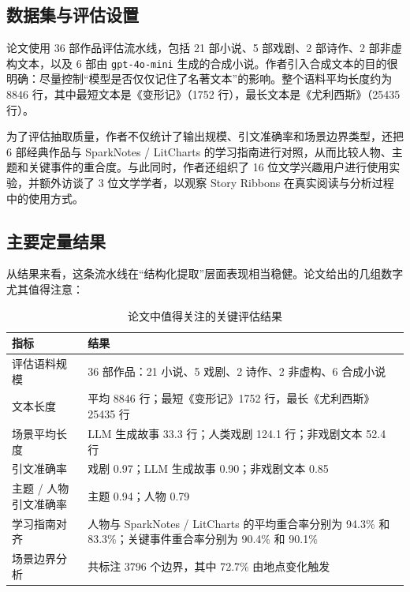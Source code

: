 \documentclass[a4paper,12pt,UTF8]{article}
\begin{document}
\subsection{数据集与评估设置}
论文使用 36 部作品评估流水线，包括 21 部小说、5 部戏剧、2 部诗作、2 部非虚构文本，以及 6 部由 \texttt{gpt-4o-mini} 生成的合成小说。作者引入合成文本的目的很明确：尽量控制“模型是否仅仅记住了名著文本”的影响。整个语料平均长度约为 8846 行，其中最短文本是《变形记》（1752 行），最长文本是《尤利西斯》（25435 行）。

为了评估抽取质量，作者不仅统计了输出规模、引文准确率和场景边界类型，还把 6 部经典作品与 SparkNotes / LitCharts 的学习指南进行对照，从而比较人物、主题和关键事件的重合度。与此同时，作者还组织了 16 位文学兴趣用户进行使用实验，并额外访谈了 3 位文学学者，以观察 Story Ribbons 在真实阅读与分析过程中的使用方式。

\subsection{主要定量结果}
从结果来看，这条流水线在“结构化提取”层面表现相当稳健。论文给出的几组数字尤其值得注意：

\begin{table}[htbp]
    \centering
    \renewcommand{\arraystretch}{1.35}
    \caption{论文中值得关注的关键评估结果}
    \begin{tabular}{|p{4.1cm}|p{8.6cm}|}
        \hline
        指标 & 结果 \\
        \hline
        评估语料规模 & 36 部作品：21 小说、5 戏剧、2 诗作、2 非虚构、6 合成小说 \\
        \hline
        文本长度 & 平均 8846 行；最短《变形记》1752 行，最长《尤利西斯》25435 行 \\
        \hline
        场景平均长度 & LLM 生成故事 33.3 行；人类戏剧 124.1 行；非戏剧文本 52.4 行 \\
        \hline
        引文准确率 & 戏剧 0.97；LLM 生成故事 0.90；非戏剧文本 0.85 \\
        \hline
        主题 / 人物引文准确率 & 主题 0.94；人物 0.79 \\
        \hline
        学习指南对齐 & 人物与 SparkNotes / LitCharts 的平均重合率分别为 94.3\% 和 83.3\%；关键事件重合率分别为 90.4\% 和 90.1\% \\
        \hline
        场景边界分析 & 共标注 3796 个边界，其中 72.7\% 由地点变化触发 \\
        \hline
    \end{tabular}
\end{table}
\end{document}

